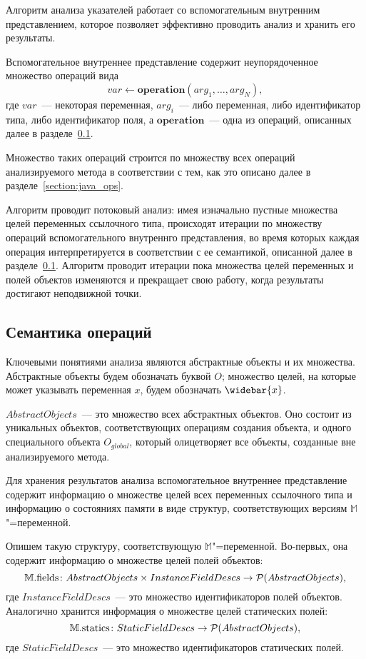\documentclass[14pt,titlepage,draft]{extarticle}
\newcommand{\M}{\ensuremath{\mathbb{M}}}
\newcommand{\Mfield}[1]{\ensuremath{\mathrm{#1}}}
\newcommand{\op}[1]{\mathbf{#1}}
\newcommand{\pts}[1]{\widebar{#1}}
\newcommand{\AO}[1]{O_{#1}}
\newcommand{\AOGlobal}{\AO{global}}
\begin{document}
    Алгоритм анализа указателей работает со вспомогательным внутренним
    представлением, которое позволяет эффективно проводить анализ и хранить его
    результаты.

    Вспомогательное внутреннее представление содержит неупорядоченное множество
    операций вида
    \[ var \gets \op{operation}(arg_1, \ldots, arg_N), \]
    где $var$~--- некоторая переменная, $arg_i$~--- либо переменная, либо
    идентификатор типа, либо идентификатор поля, а $\op{operation}$~--- одна из
    операций, описанных далее в разделе~\ref{section:ops_semantic}.

    Множество таких операций строится по множеству всех операций
    анализируемого метода в соответствии с тем, как это описано далее в
    разделе~\ref{section:java_ops}.

    Алгоритм проводит потоковый анализ: имея изначально пустные
    множества целей переменных ссылочного типа, происходят итерации по
    множеству операций вспомогательного внутреннго представления, во время
    которых каждая операция интерпретируется в соответствии с ее семантикой,
    описанной далее в разделе~\ref{section:ops_semantic}. Алгоритм проводит
    итерации пока множества целей переменных и полей объектов изменяются и
    прекращает свою работу, когда результаты достигают неподвижной точки.


  \subsection{Семантика операций}
    \label{section:ops_semantic}

    Ключевыми понятиями анализа являются абстрактные объекты и их множества.
    Абстрактные объекты будем обозначать буквой $O$; множество целей, на
    которые может указывать переменная $x$, будем обозначать $\pts{x}$.

    $AbstractObjects$~--- это множество всех абстрактных объектов. Оно
    состоит из уникальных объектов, соответствующих операциям создания
    объекта, и одного специального объекта $\AOGlobal$, который олицетворяет
    все объекты, созданные вне анализируемого метода.

    Для хранения результатов анализа вспомогательное внутреннее представление
    содержит информацию о множестве целей всех переменных ссылочного
    типа и информацию о состояниях памяти в виде структур, соответствующих
    версиям \M"=переменной.

    Опишем такую структуру, соответствующую \M"=переменной. Во-первых, она
    содержит информацию о множестве целей полей объектов:
    \[ \M.\Mfield{fields}\colon
      AbstractObjects \times InstanceFieldDescs \to
      \powerset{AbstractObjects},
    \]
    где $InstanceFieldDescs$~--- это множество идентификаторов полей
    объектов.  Аналогично хранится информация о множестве целей статических
    полей:
    \[ \M.\Mfield{statics}\colon
      StaticFieldDescs \to \powerset{AbstractObjects},
    \]
    где $StaticFieldDescs$~--- это множество идентификаторов
    статических полей.
\end{document}
